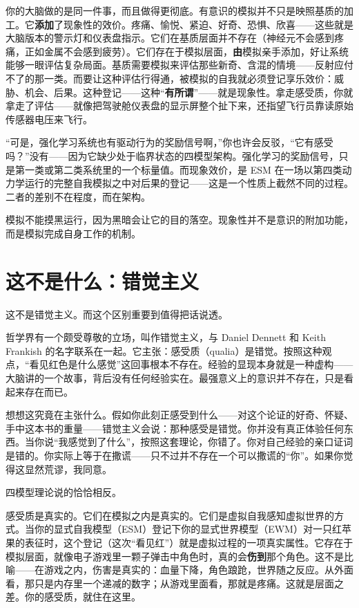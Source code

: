 \documentclass[11pt, twoside, openright]{book}
\begin{document}
你的大脑做的是同一件事，而且做得更彻底。有意识的模拟并不只是映照基质的加工。它\textbf{添加}了现象性的效价。疼痛、愉悦、紧迫、好奇、恐惧、欣喜------这些就是大脑版本的警示灯和仪表盘指示。它们在基质层面并不存在（神经元不会感到疼痛，正如金属不会感到疲劳）。它们存在于模拟层面，\textbf{由}模拟亲手添加，好让系统能够一眼评估复杂局面。基质需要模拟来评估那些新奇、含混的情境------反射应付不了的那一类。而要让这种评估行得通，被模拟的自我就必须登记享乐效价：威胁、机会、后果。这种登记------这种“\textbf{有所谓}”------就是现象性。拿走感受质，你就拿走了评估------就像把驾驶舱仪表盘的显示屏整个扯下来，还指望飞行员靠读原始传感器电压来飞行。

“可是，强化学习系统也有驱动行为的奖励信号啊，”你也许会反驳，“它有感受吗？”没有------因为它缺少处于临界状态的四模型架构。强化学习的奖励信号，只是第一类或第二类系统里的一个标量值。而现象效价，是 ESM 在一场以第四类动力学运行的完整自我模拟之中对后果的登记------这是一个性质上截然不同的过程。二者的差别不在程度，而在架构。

模拟不能摸黑运行，因为黑暗会让它的目的落空。现象性并不是意识的附加功能，而是模拟完成自身工作的机制。

\section*{这不是什么：错觉主义}

这不是错觉主义。而这个区别重要到值得把话说透。

哲学界有一个颇受尊敬的立场，叫作错觉主义，与 Daniel Dennett 和 Keith Frankish 的名字联系在一起。它主张：感受质（qualia）是错觉。按照这种观点，“看见红色是什么感觉”这回事根本不存在。经验的显现本身就是一种虚构------大脑讲的一个故事，背后没有任何经验实在。最强意义上的意识并不存在，只是看起来存在而已。

想想这究竟在主张什么。假如你此刻正感受到什么------对这个论证的好奇、怀疑、手中这本书的重量------错觉主义会说：那种感受是错觉。你并没有真正体验任何东西。当你说“我感觉到了什么”，按照这套理论，你错了。你对自己经验的亲口证词是错的。你实际上等于在撒谎------只不过并不存在一个可以撒谎的“你”。如果你觉得这显然荒谬，我同意。

四模型理论说的恰恰相反。

感受质是真实的。它们在模拟之内是真实的。它们是虚拟自我感知虚拟世界的方式。当你的显式自我模型（ESM）登记下你的显式世界模型（EWM）对一只红苹果的表征时，这个登记（这次“看见红”）就是虚拟过程的一项真实属性。它存在于模拟层面，就像电子游戏里一颗子弹击中角色时，真的会\textbf{伤到}那个角色。这不是比喻------在游戏之内，伤害是真实的：血量下降，角色踉跄，世界随之反应。从外面看，那只是内存里一个递减的数字；从游戏里面看，那就是疼痛。这就是层面之差。你的感受质，就住在这里。
\end{document}
